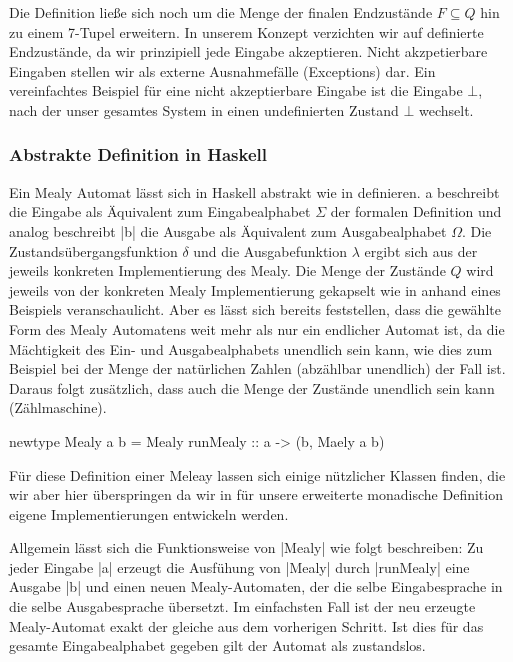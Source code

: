 Die Definition ließe sich noch um die Menge der finalen Endzustände $F \subseteq Q$ hin zu einem 7-Tupel erweitern. In unserem Konzept verzichten wir auf definierte Endzustände, da wir prinzipiell jede Eingabe akzeptieren. Nicht akzpetierbare Eingaben stellen wir als externe Ausnahmefälle (Exceptions) dar. Ein vereinfachtes Beispiel für eine nicht akzeptierbare Eingabe ist die Eingabe $\bot$, nach der unser gesamtes System in einen undefinierten Zustand $\bot$ wechselt.

\subsubsection{Abstrakte Definition in Haskell}

Ein Mealy Automat lässt sich in Haskell abstrakt wie in  definieren. {\ttfamily a} beschreibt die Eingabe als Äquivalent zum Eingabealphabet $\Sigma$ der formalen Definition und analog beschreibt |b| die Ausgabe als Äquivalent zum Ausgabealphabet $\Omega$. Die Zustandsübergangsfunktion $\delta$ und die Ausgabefunktion $\lambda$ ergibt sich aus der jeweils konkreten Implementierung des Mealy. Die Menge der Zustände $Q$ wird jeweils von der konkreten Mealy Implementierung gekapselt wie in  anhand eines Beispiels veranschaulicht. Aber es lässt sich bereits feststellen, dass die gewählte Form des Mealy Automatens weit mehr als nur ein endlicher Automat ist, da die Mächtigkeit des Ein- und Ausgabealphabets unendlich sein kann, wie dies zum Beispiel bei der Menge der natürlichen Zahlen (abzählbar unendlich) der Fall ist. Daraus folgt zusätzlich, dass auch die Menge der Zustände unendlich sein kann (Zählmaschine).

\begin{haskell}[label={lst:haskell-mealy},caption={Definition Mealy in Haskell\protect\footnotemark},float]
newtype Mealy a b = Mealy { runMealy :: a -> (b, Maely a b) }
\end{haskell}

Für diese Definition einer Meleay lassen sich einige nützlicher Klassen finden, die wir aber hier überspringen da wir in  für unsere erweiterte monadische Definition eigene Implementierungen entwickeln werden.

Allgemein lässt sich die Funktionsweise von |Mealy| wie folgt beschreiben: Zu jeder Eingabe |a| erzeugt die Ausfühung von |Mealy| durch |runMealy| eine Ausgabe |b| und einen neuen Mealy-Automaten, der die selbe Eingabesprache in die selbe Ausgabesprache übersetzt. Im einfachsten Fall ist der neu erzeugte Mealy-Automat exakt der gleiche aus dem vorherigen Schritt. Ist dies für das gesamte Eingabealphabet gegeben gilt der Automat als zustandslos.

